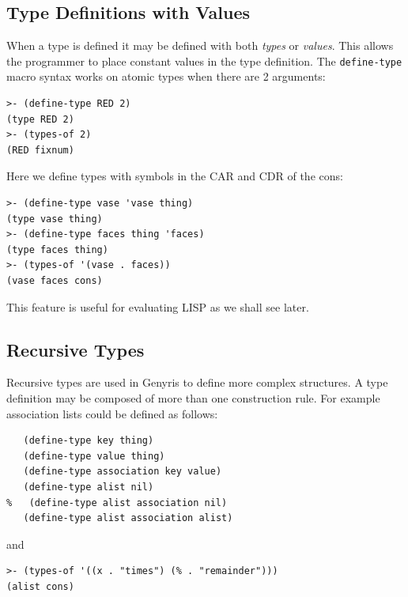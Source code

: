 \documentclass[a4paper,12pt,dvips]{article}
\begin{document}
\subsection{Type Definitions with Values}
When a type is defined it may be defined with both \emph{types} or \emph{values}. This allows the programmer to place constant values in the type definition. The \texttt{define-type} macro syntax works on atomic types when there are 2 arguments:
\begin{verbatim}
>- (define-type RED 2)
(type RED 2)
>- (types-of 2)
(RED fixnum)
\end{verbatim}
Here we define types with symbols in the CAR and CDR of the cons:
\begin{verbatim}
>- (define-type vase 'vase thing)
(type vase thing)
>- (define-type faces thing 'faces)
(type faces thing)
>- (types-of '(vase . faces))
(vase faces cons)
\end{verbatim}
This feature is useful for evaluating LISP as we shall see later.

\subsection{Recursive Types}
Recursive types are used in Genyris to define more complex structures. A type definition may be composed of more than one construction rule. For example association lists could be defined as follows:
\label{alists}\begin{verbatim}
   (define-type key thing)
   (define-type value thing)
   (define-type association key value)
   (define-type alist nil)
%   (define-type alist association nil)
   (define-type alist association alist)
\end{verbatim} 
and
\begin{verbatim}
>- (types-of '((x . "times") (% . "remainder")))
(alist cons)
\end{verbatim}
\end{document}
